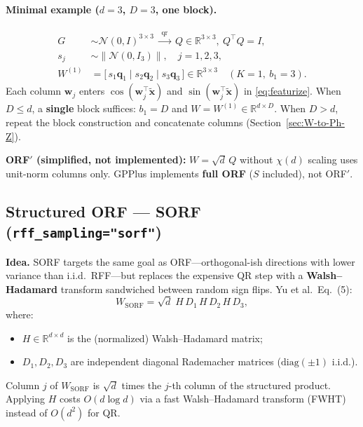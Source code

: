 \documentclass[11pt]{article}
\begin{document}
\paragraph{Minimal example ($d=3$, $D=3$, one block).}
\begin{align*}
  G &\sim \mathcal N(0,I)^{3\times 3}
  \;\xrightarrow{\;\mathrm{qr}\;}\;
  Q\in\mathbb{R}^{3\times 3},\ Q^{\top}Q=I, \\
  s_j &\sim \|\mathcal N(0,I_3)\|,\quad j=1,2,3, \\
  W^{(1)} &= \bigl[\,s_1\mathbf q_1 \;\big|\; s_2\mathbf q_2 \;\big|\; s_3\mathbf q_3\,\bigr] \in \mathbb{R}^{3\times 3}
  \quad (K=1,\ b_1=3).
\end{align*}
Each column $\mathbf w_j$ enters $\cos(\mathbf w_j^{\top}\tilde{\mathbf x})$ and $\sin(\mathbf w_j^{\top}\tilde{\mathbf x})$ in \eqref{eq:featurize}.
When $D \le d$, a \textbf{single} block suffices: $b_1=D$ and $W=W^{(1)}\in\mathbb{R}^{d\times D}$.
When $D > d$, repeat the block construction and concatenate columns (Section~\ref{sec:W-to-Ph-Z}).

\begin{diffbox}
\textbf{ORF$'$ (simplified, not implemented):}
$W=\sqrt{d}\,Q$ without $\chi(d)$ scaling uses unit-norm columns only.
GPPlus implements \textbf{full ORF} ($S$ included), not ORF$'$.
\end{diffbox}

\subsection{Structured ORF --- SORF (\texttt{rff\_sampling="sorf"})}
\label{sec:sorf}

\textbf{Idea.} SORF targets the same goal as ORF---orthogonal-ish directions with lower variance than i.i.d.\
RFF---but replaces the expensive QR step with a \textbf{Walsh--Hadamard} transform sandwiched between
random sign flips. Yu et al.\ Eq.~(5):
\begin{equation}
  \label{eq:sorf-paper}
  \boxed{
  W_{\mathrm{SORF}} = \sqrt{d}\; H\, D_1\, H\, D_2\, H\, D_3,
  }
\end{equation}
where:
\begin{itemize}
  \item $H\in\mathbb{R}^{d\times d}$ is the (normalized) Walsh--Hadamard matrix;
  \item $D_1,D_2,D_3$ are independent diagonal Rademacher matrices ($\mathrm{diag}(\pm1)$ i.i.d.).
\end{itemize}
Column $j$ of $W_{\mathrm{SORF}}$ is $\sqrt{d}$ times the $j$-th column of the structured product.
Applying $H$ costs $O(d\log d)$ via a fast Walsh--Hadamard transform (FWHT) instead of $O(d^2)$ for QR.
\end{document}
